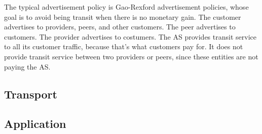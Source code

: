 The typical advertisement policy is Gao-Rexford advertisement policies,
whose goal is to avoid being transit when there is no monetary gain.
The customer advertises to providers, peers, and other customers. The
peer advertises to customers. The provider advertises to costumers.
The AS provides transit service to all its customer traffic, because that's
what customers pay for. It does not provide transit service between two
providers or peers, since these entities are not paying the AS.

\subsection{Transport}

\subsection{Application}


